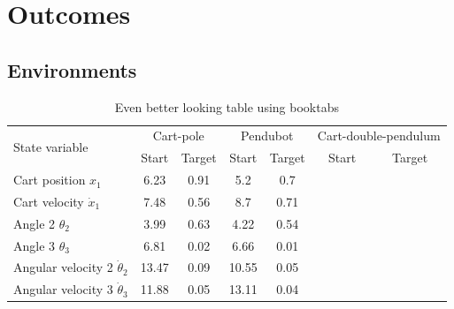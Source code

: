\chapter{Outcomes}

\ifpdf
    \graphicspath{{Chapter3/Figs/Raster/}{Chapter3/Figs/PDF/}{Chapter3/Figs/}}
\else
    \graphicspath{{Chapter3/Figs/Vector/}{Chapter3/Figures/}}
\fi

\section{Environments}
\begin{table}
\caption{Even better looking table using booktabs}
\centering
\label{table:good_table}
\begin{tabular}{l c c c c c c}
\toprule
\multirow{2}{*}{State variable} & \multicolumn{2}{c}{Cart-pole} & \multicolumn{2}{c}{Pendubot}  &
\multicolumn{2}{c}{Cart-double-pendulum}  \\ 
\cmidrule{2-7}
  & Start & Target & Start & Target & Start & Target \\ 
\midrule
Cart position $x_1$ & 6.23 & 0.91 & 5.2  & 0.7 & & \\

Cart velocity $\dot x_1$ & 7.48 & 0.56 & 8.7  & 0.71& & \\

Angle 2 $\theta_2$ & 3.99 & 0.63 & 4.22 & 0.54& & \\

Angle 3 $\theta_3$ & 6.81 & 0.02 & 6.66 & 0.01 & &\\

Angular velocity 2 $\dot \theta_2$ & 13.47 & 0.09 & 10.55 & 0.05 & &\\

Angular velocity 3 $\dot \theta_3$ & 11.88 & 0.05 & 13.11 & 0.04& &\\ 
\bottomrule
\end{tabular}
\end{table}

